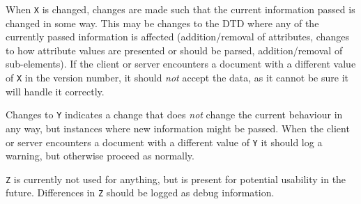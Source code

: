 When \texttt{X} is changed, changes are made such that the current information
passed is changed in some way. This may be changes to the DTD where any of the
currently passed information is affected (addition/removal of attributes,
changes to how attribute values are presented or should be parsed,
addition/removal of sub-elements). If the client or server encounters a
document with a different value of \texttt{X} in the version number, it should
\textit{not} accept the data, as it cannot be sure it will handle it correctly.

Changes to \texttt{Y} indicates a change that does \textit{not} change the
current behaviour in any way, but instances where new information might be
passed. When the client or server encounters a document with a different value
of \texttt{Y} it should log a warning, but otherwise proceed as normally.

\texttt{Z} is currently not used for anything, but is present for potential
usability in the future. Differences in \texttt{Z} should be logged as debug
information.
